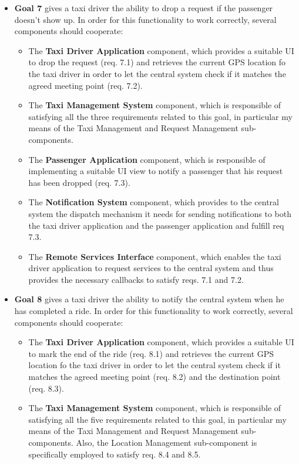 \begin{itemize}
\begin{itemize}
	\end{itemize}
	\item \textbf{Goal 7} gives a taxi driver the ability to drop a request if the passenger doesn't show up. In order for this functionality to work correctly, several components should cooperate:
	\begin{itemize}
	\item The \textbf{Taxi Driver Application} component, which provides a suitable UI to drop the request (req. 7.1) and retrieves the current GPS location fo the taxi driver in order to let the central system check if it matches the agreed meeting point (req. 7.2).
	\item The \textbf{Taxi Management System} component, which is responsible of satisfying all the three requirements related to this goal, in particular my means of the Taxi Management and Request Management sub-components.
	\item The \textbf{Passenger Application} component, which is responsible of implementing a suitable UI view to notify a passenger that his request has been dropped (req. 7.3).
	\item The \textbf{Notification System} component, which provides to the central system the dispatch mechanism it needs for sending notifications to both the taxi driver application and the passenger application and fulfill req 7.3.
	\item The \textbf{Remote Services Interface} component, which enables the taxi driver application to request services to the central system and thus provides the necessary callbacks to satisfy reqs. 7.1 and 7.2.
	\end{itemize}
	\item \textbf{Goal 8} gives a taxi driver the ability to notify the central system when he has completed a ride. In order for this functionality to work correctly, several components should cooperate:
	\begin{itemize}
	\item The \textbf{Taxi Driver Application} component, which provides a suitable UI to mark the end of the ride (req. 8.1) and retrieves the current GPS location fo the taxi driver in order to let the central system check if it matches the agreed meeting point (req. 8.2) and the destination point (req. 8.3).
	\item The \textbf{Taxi Management System} component, which is responsible of satisfying all the five requirements related to this goal, in particular my means of the Taxi Management and Request Management sub-components. Also, the Location Management sub-component is specifically employed to satisfy req. 8.4 and 8.5.

\end{itemize}
\end{itemize}
